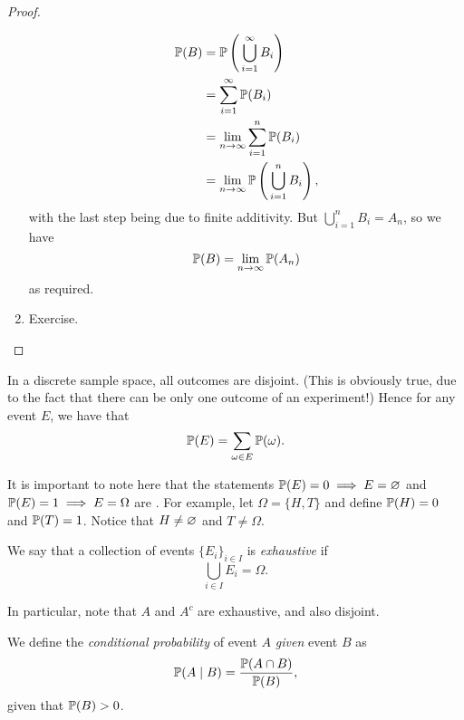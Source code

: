 \begin{proof}
\begin{enumerate}
      \begin{align*}
        \operatorname{\mathbb{P}}(B) &= \operatorname{\mathbb{P}} \left( \, \bigcup_{i = 1}^{\infty} B_i \right) \\
                 &= \sum_{i = 1}^{\infty} \operatorname{\mathbb{P}}(B_i) \\
                 &= \lim_{n \to \infty} \sum_{i = 1}^{n} \operatorname{\mathbb{P}}(B_i) \\
                 &= \lim_{n \to \infty} \operatorname{\mathbb{P}} \left( \, \bigcup_{i = 1}^{n} B_i \right),
      \end{align*}
      with the last step being due to finite additivity. But $\bigcup_{i = 1}^{n} B_i = A_n$, so we have \[
        \operatorname{\mathbb{P}}(B) = \lim_{n \to \infty} \operatorname{\mathbb{P}}(A_n)
      \] as required.
    \item Exercise. \qedhere
  \end{enumerate}
\end{proof}

In a discrete sample space, all outcomes are disjoint. (This is obviously true, due to the fact that there can be only one outcome of an experiment!) Hence for any event $E$, we have that \[
  \operatorname{\mathbb{P}}(E) = \sum_{\omega \in E} \operatorname{\mathbb{P}}(\omega).
\] 
\begin{remark}
  It is important to note here that the statements $\operatorname{\mathbb{P}}(E) = 0 \implies E = \varnothing$ and $\operatorname{\mathbb{P}}(E) = 1 \implies E = \Omega$ are . For example, let $\Omega = \{H, T\}$ and define $\operatorname{\mathbb{P}}(H) = 0$ and $\operatorname{\mathbb{P}}(T) = 1$. Notice that $H \neq \varnothing$ and $T \neq \Omega$.
\end{remark}

\begin{definition}
We say that a collection of events $\{E_i\}_{i \in I}$ is \emph{exhaustive} if \[
    \bigcup_{i \in I} E_i = \Omega.
  \] 
\end{definition}

In particular, note that $A$ and $A^{c}$ are exhaustive, and also disjoint.

\begin{definition}
  We define the \emph{conditional probability} of event $A$ \emph{given} event $B$ as \[
    \operatorname{\mathbb{P}}(A \mid B) = \frac{\operatorname{\mathbb{P}}(A \cap B)}{\operatorname{\mathbb{P}}(B)},
  \] given that $\operatorname{\mathbb{P}}(B) > 0$.
\end{definition}


